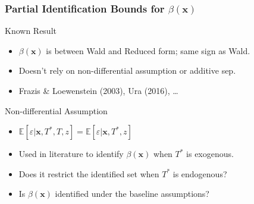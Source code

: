 \documentclass{beamer}
\begin{document}
%
%
\begin{frame}
  \frametitle{Partial Identification Bounds for $\beta(\mathbf{x})$}

  \begin{block}{Known Result}
    \begin{itemize}
      \item $\beta(\mathbf{x})$ is between Wald and Reduced form; same sign as Wald.
      \item Doesn't rely on non-differential assumption or additive sep.\
      \item Frazis \& Loewenstein (2003), Ura (2016), \ldots
    \end{itemize}
    \end{block}

    \begin{alertblock}{Non-differential Assumption}
      \begin{itemize}
        \item $\mathbb{E}[\varepsilon|\mathbf{x},T^*,T,z] = \mathbb{E}[\varepsilon|\mathbf{x},T^*,z]$
        \item Used in literature to identify $\beta(\mathbf{x})$ when $T^*$ is exogenous. 
        \item Does it restrict the identified set when $T^*$ is \alert{endogenous}? 
        \item Is $\beta(\mathbf{x})$ identified under the baseline assumptions?
      \end{itemize}
    \end{alertblock}

\end{frame}
\end{document}
